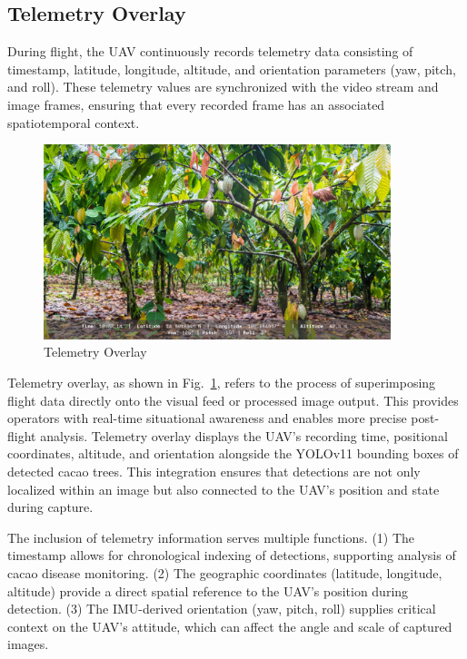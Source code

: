 \subsection{Telemetry Overlay}

During flight, the UAV continuously records telemetry data consisting of timestamp, latitude, longitude, altitude, and orientation parameters (yaw, pitch, and roll). These telemetry values are synchronized with the video stream and image frames, ensuring that every recorded frame has an associated spatiotemporal context.

\begin{figure}[H]
	\centering
	\caption{Telemetry Overlay}
	\label{fig:telemetry_overlay}
	\includegraphics[width=0.9\textwidth]{figures/Telemetry.pdf}
\end{figure}

Telemetry overlay, as shown in Fig.~\ref{fig:telemetry_overlay}, refers to the process of superimposing flight data directly onto the visual feed or processed image output. This provides operators with real-time situational awareness and enables more precise post-flight analysis. Telemetry overlay displays the UAV’s recording time, positional coordinates, altitude, and orientation alongside the YOLOv11 bounding boxes of detected cacao trees. This integration ensures that detections are not only localized within an image but also connected to the UAV’s position and state during capture.

The inclusion of telemetry information serves multiple functions.
(1) The timestamp allows for chronological indexing of detections, supporting analysis of cacao disease monitoring.
(2) The geographic coordinates (latitude, longitude, altitude) provide a direct spatial reference to the UAV’s position during detection.
(3) The IMU-derived orientation (yaw, pitch, roll) supplies critical context on the UAV’s attitude, which can affect the angle and scale of captured images.

